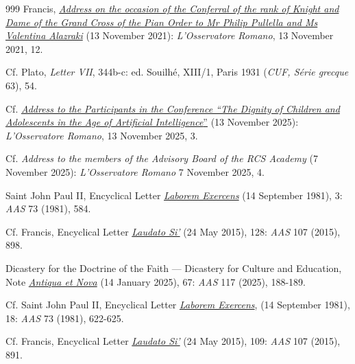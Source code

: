 \documentclass{article}
\begin{document}
\begin{thebibliography}{999}
 Francis, \href{https://www.vatican.va/content/francesco/en/speeches/2021/november/documents/20211113-onoreficenze-giornalisti.html}{\emph{Address on the occasion of the Conferral of the rank of Knight and Dame of the Grand Cross of the Pian Order to Mr Philip Pullella and Ms Valentina Alazraki}} (13 November 2021): \emph{L'Osservatore Romano}, 13 November 2021, 12.

 Cf. Plato, \emph{Letter VII}, 344b-c: ed. Souilhé, XIII/1, Paris 1931 (\emph{CUF, Série grecque} 63), 54.

 Cf. \href{https://www.vatican.va/content/leo-xiv/en/speeches/2025/november/documents/20251113-fondazione-infanzia-adolescenza.html}{\emph{Address to the Participants in the Conference ``The Dignity of Children and Adolescents in the Age of Artificial Intelligence}''} (13 November 2025): \emph{L'Osservatore Romano}, 13 November 2025, 3.

 Cf. \emph{Address to the members of the Advisory Board of the RCS Academy} (7 November 2025): \emph{L'Osservatore Romano} 7 November 2025, 4.

 Saint John Paul II, Encyclical Letter \href{https://www.vatican.va/content/john-paul-ii/en/encyclicals/documents/hf_jp-ii_enc_14091981_laborem-exercens.html}{\emph{Laborem Exercens}} (14 September 1981), 3: \emph{AAS} 73 (1981), 584.

 Cf. Francis, Encyclical Letter \href{https://www.vatican.va/content/francesco/en/encyclicals/documents/papa-francesco_20150524_enciclica-laudato-si.html}{\emph{Laudato Si'}} (24 May 2015), 128: \emph{AAS} 107 (2015), 898.

 Dicastery for the Doctrine of the Faith --- Dicastery for Culture and Education, Note \href{https://www.vatican.va/roman_curia/congregations/cfaith/documents/rc_ddf_doc_20250128_antiqua-et-nova_en.html}{\emph{Antiqua et Nova}} (14 January 2025), 67: \emph{AAS} 117 (2025), 188-189.

 Cf. Saint John Paul II, Encyclical Letter \href{https://www.vatican.va/content/john-paul-ii/en/encyclicals/documents/hf_jp-ii_enc_14091981_laborem-exercens.html}{\emph{Laborem Exercens}}, (14 September 1981), 18: \emph{AAS} 73 (1981), 622-625.

 Cf. Francis, Encyclical Letter \href{https://www.vatican.va/content/francesco/en/encyclicals/documents/papa-francesco_20150524_enciclica-laudato-si.html}{\emph{Laudato Si'}} (24 May 2015), 109: \emph{AAS} 107 (2015), 891.


\end{thebibliography}
\end{document}
